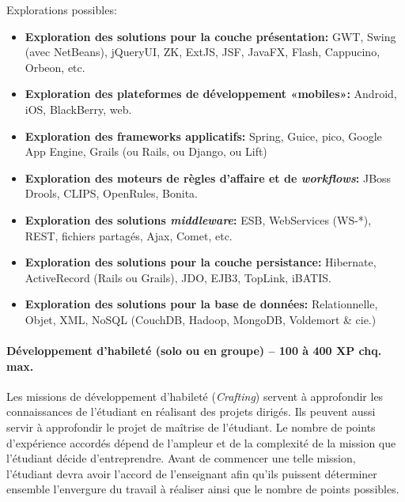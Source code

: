 \documentclass{article}
\begin{document}
Explorations possibles:
\begin{itemize}
\item \textbf{Exploration des solutions pour la couche présentation:} GWT, Swing (avec NetBeans), jQueryUI, ZK, ExtJS, JSF, JavaFX, Flash, Cappucino, Orbeon, etc.
\item \textbf{Exploration des plateformes de développement «mobiles»:} Android, iOS, BlackBerry, web.
\item \textbf{Exploration des frameworks applicatifs:} Spring, Guice, pico, Google App Engine, Grails (ou Rails, ou Django, ou Lift)
\item \textbf{Exploration des moteurs de règles d'affaire et de \emph{workflows}:} JBoss Drools, CLIPS, OpenRules, Bonita.
\item \textbf{Exploration des solutions \emph{middleware}:} ESB, WebServices (WS-*), REST, fichiers partagés, Ajax, Comet, etc.
\item \textbf{Exploration des solutions pour la couche persistance:} Hibernate, ActiveRecord (Rails ou Grails), JDO, EJB3, TopLink, iBATIS.
\item \textbf{Exploration des solutions pour la base de données:} Relationnelle, Objet, XML, NoSQL (CouchDB, Hadoop, MongoDB, Voldemort \& cie.)
\end{itemize}

\paragraph{Développement d'habileté (solo ou en groupe) -- 100 à 400 XP chq. max.}
\label{par:developpement_d_habilete}

Les missions de développement d'habileté (\emph{Crafting}) servent à approfondir les connaissances de l'étudiant en réalisant des projets dirigés. Ils peuvent aussi servir à approfondir le projet de maîtrise de l'étudiant. Le nombre de points d'expérience accordés dépend de l'ampleur et de la complexité de la mission que l'étudiant décide d'entreprendre. Avant de commencer une telle mission, l'étudiant devra avoir l'accord de l'enseignant afin qu'ils puissent déterminer ensemble l'envergure du travail à réaliser ainsi que le nombre de points possibles.
\end{document}
